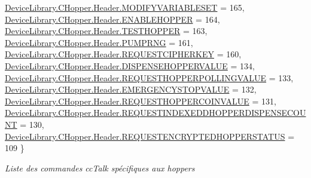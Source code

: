 \begin{DoxyCompactItemize}
\newline
\mbox{\hyperlink{group___header_ggab8e15517b29b9562c7d7e8616d61c855ae924a1d3fed578124d2542b501b9d5be}{Device\+Library.\+C\+Hopper.\+Header.\+M\+O\+D\+I\+F\+Y\+V\+A\+R\+I\+A\+B\+L\+E\+S\+ET}} = 165, 
\mbox{\hyperlink{group___header_ggab8e15517b29b9562c7d7e8616d61c855a1c7e15da01d0f3d0d6c3699f4428ae19}{Device\+Library.\+C\+Hopper.\+Header.\+E\+N\+A\+B\+L\+E\+H\+O\+P\+P\+ER}} = 164, 
\mbox{\hyperlink{group___header_ggab8e15517b29b9562c7d7e8616d61c855a94aba60ee791b51c24268564d6d4db34}{Device\+Library.\+C\+Hopper.\+Header.\+T\+E\+S\+T\+H\+O\+P\+P\+ER}} = 163, 
\mbox{\hyperlink{group___header_ggab8e15517b29b9562c7d7e8616d61c855ab3b80d8e35f9bf8fd78fbb4ebf2e065d}{Device\+Library.\+C\+Hopper.\+Header.\+P\+U\+M\+P\+R\+NG}} = 161, 
\newline
\mbox{\hyperlink{group___header_ggab8e15517b29b9562c7d7e8616d61c855aaa3f8f4acd8572ce7e9f4fe87954b6c0}{Device\+Library.\+C\+Hopper.\+Header.\+R\+E\+Q\+U\+E\+S\+T\+C\+I\+P\+H\+E\+R\+K\+EY}} = 160, 
\mbox{\hyperlink{group___header_ggab8e15517b29b9562c7d7e8616d61c855a3f0803c91adce917551e3653ce6ab02b}{Device\+Library.\+C\+Hopper.\+Header.\+D\+I\+S\+P\+E\+N\+S\+E\+H\+O\+P\+P\+E\+R\+V\+A\+L\+UE}} = 134, 
\mbox{\hyperlink{group___header_ggab8e15517b29b9562c7d7e8616d61c855af4cf967e4b4c084bb9148099781b3a49}{Device\+Library.\+C\+Hopper.\+Header.\+R\+E\+Q\+U\+E\+S\+T\+H\+O\+P\+P\+E\+R\+P\+O\+L\+L\+I\+N\+G\+V\+A\+L\+UE}} = 133, 
\mbox{\hyperlink{group___header_ggab8e15517b29b9562c7d7e8616d61c855ab7f6a886cf52347442b934ad59273c7d}{Device\+Library.\+C\+Hopper.\+Header.\+E\+M\+E\+R\+G\+E\+N\+C\+Y\+S\+T\+O\+P\+V\+A\+L\+UE}} = 132, 
\newline
\mbox{\hyperlink{group___header_ggab8e15517b29b9562c7d7e8616d61c855a6ad8e7feb8e305d7b549b257c70d3ddf}{Device\+Library.\+C\+Hopper.\+Header.\+R\+E\+Q\+U\+E\+S\+T\+H\+O\+P\+P\+E\+R\+C\+O\+I\+N\+V\+A\+L\+UE}} = 131, 
\mbox{\hyperlink{group___header_ggab8e15517b29b9562c7d7e8616d61c855a954b2d7e92fb3c676e4246f551a03871}{Device\+Library.\+C\+Hopper.\+Header.\+R\+E\+Q\+U\+E\+S\+T\+I\+N\+D\+E\+X\+E\+D\+D\+H\+O\+P\+P\+E\+R\+D\+I\+S\+P\+E\+N\+S\+E\+C\+O\+U\+NT}} = 130, 
\mbox{\hyperlink{group___header_ggab8e15517b29b9562c7d7e8616d61c855aa0d004c8327a3e8b0ae5165246991c25}{Device\+Library.\+C\+Hopper.\+Header.\+R\+E\+Q\+U\+E\+S\+T\+E\+N\+C\+R\+Y\+P\+T\+E\+D\+H\+O\+P\+P\+E\+R\+S\+T\+A\+T\+US}} = 109
 \}
\begin{DoxyCompactList}\small\item\em Liste des commandes cc\+Talk spécifiques aux hoppers \end{DoxyCompactList}\end{DoxyCompactItemize}


